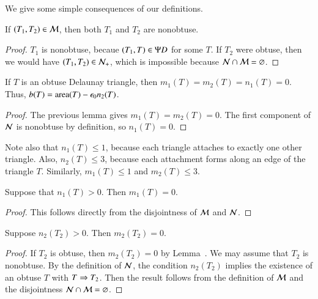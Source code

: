 We give  some simple consequences of our definitions.

\begin{lemma} If $(T_1,T_2)\in \mathcal M$, then both $T_1$ and $T_2$ are nonobtuse.
\end{lemma}

\begin{proof}  $T_1$ is nonobtuse, becaue $(T_1,T)\in\Psi D$ for some $T$.
If $T_2$ were obtuse, then we would have $(T_1,T_2)\in \mathcal N_+$, which is impossible
because $\mathcal N\cap \mathcal M = \varnothing$.
\end{proof}

\begin{lemma}[obtuse $b$]  If $T$ is an obtuse Delaunay triangle, then $m_1(T)=m_2(T)=n_1(T)=0$.
Thus, $b(T) = {\operatorname{area}}(T) - \epsilon_0 n_2(T)$.
\end{lemma}

\begin{proof}  The previous lemma gives $m_1(T)=m_2(T)=0$.  The first component of
$\mathcal N$ is nonobtuse by definition, so $n_1(T)=0$.
\end{proof}

\begin{remark}
  Note also that $n_1(T)\le 1$, because each triangle attaches to
  exactly one other triangle.  Also, $n_2(T)\le 3$, because each
  attachment forms along an edge of the triangle $T$.  Similarly,
  $m_1(T)\le 1$ and $m_2(T)\le 3$.
\end{remark}

\begin{lemma}  Suppose that $n_1(T)>0$. Then $m_1(T)=0$.
\end{lemma}

\begin{proof} This follows directly from the disjointness of $\mathcal M$ and $\mathcal N$.
\end{proof}

\begin{lemma}  Suppose $n_2(T_2)>0$.  Then $m_2(T_2)=0$.
\end{lemma}

\begin{proof} If $T_2$ is obtuse, then $m_2(T_2)=0$ by Lemma~.
We may assume that $T_2$ is nonobtuse.
By the definition of $\mathcal N$, the condition $n_2(T_2)$ implies the existence of an obtuse $T$ with $T\Rightarrow T_2$.
Then the result follows from the definition of $\mathcal M$ and the disjointness $\mathcal N\cap\mathcal M = \varnothing$.
\end{proof}



